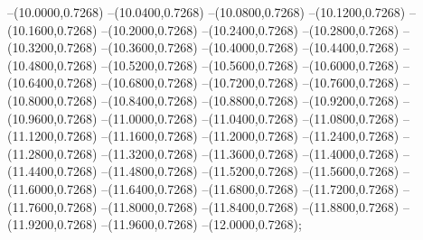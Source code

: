 {	--(10.0000,0.7268)
	--(10.0400,0.7268)
	--(10.0800,0.7268)
	--(10.1200,0.7268)
	--(10.1600,0.7268)
	--(10.2000,0.7268)
	--(10.2400,0.7268)
	--(10.2800,0.7268)
	--(10.3200,0.7268)
	--(10.3600,0.7268)
	--(10.4000,0.7268)
	--(10.4400,0.7268)
	--(10.4800,0.7268)
	--(10.5200,0.7268)
	--(10.5600,0.7268)
	--(10.6000,0.7268)
	--(10.6400,0.7268)
	--(10.6800,0.7268)
	--(10.7200,0.7268)
	--(10.7600,0.7268)
	--(10.8000,0.7268)
	--(10.8400,0.7268)
	--(10.8800,0.7268)
	--(10.9200,0.7268)
	--(10.9600,0.7268)
	--(11.0000,0.7268)
	--(11.0400,0.7268)
	--(11.0800,0.7268)
	--(11.1200,0.7268)
	--(11.1600,0.7268)
	--(11.2000,0.7268)
	--(11.2400,0.7268)
	--(11.2800,0.7268)
	--(11.3200,0.7268)
	--(11.3600,0.7268)
	--(11.4000,0.7268)
	--(11.4400,0.7268)
	--(11.4800,0.7268)
	--(11.5200,0.7268)
	--(11.5600,0.7268)
	--(11.6000,0.7268)
	--(11.6400,0.7268)
	--(11.6800,0.7268)
	--(11.7200,0.7268)
	--(11.7600,0.7268)
	--(11.8000,0.7268)
	--(11.8400,0.7268)
	--(11.8800,0.7268)
	--(11.9200,0.7268)
	--(11.9600,0.7268)
	--(12.0000,0.7268);
}
